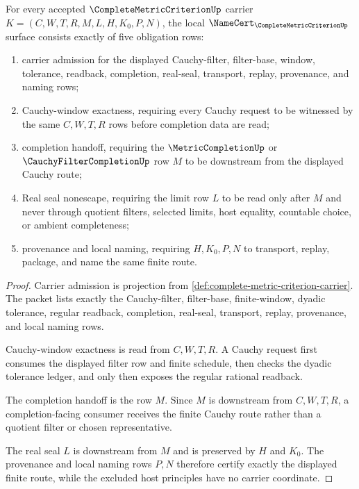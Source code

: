 \begin{theorem}
\label{thm:complete-metric-criterion-namecert-obligations}
For every accepted $\CompleteMetricCriterionUp$ carrier
$K=(C,W,T,R,M,L,H,K_0,P,N)$, the local
$\NameCert_{\CompleteMetricCriterionUp}$ surface consists exactly of five
obligation rows:
\begin{enumerate}
\item carrier admission for the displayed Cauchy-filter, filter-base, window,
  tolerance, readback, completion, real-seal, transport, replay, provenance,
  and naming rows;
\item Cauchy-window exactness, requiring every Cauchy request to be witnessed
  by the same $C,W,T,R$ rows before completion data are read;
\item completion handoff, requiring the $\MetricCompletionUp$ or
  $\CauchyFilterCompletionUp$ row $M$ to be downstream from the displayed
  Cauchy route;
\item Real seal nonescape, requiring the limit row $L$ to be read only after
  $M$ and never through quotient filters, selected limits, host equality,
  countable choice, or ambient completeness;
\item provenance and local naming, requiring $H,K_0,P,N$ to transport,
  replay, package, and name the same finite route.
\end{enumerate}
\end{theorem}
\begin{proof}
Carrier admission is projection from
\autoref{def:complete-metric-criterion-carrier}. The packet lists exactly the
Cauchy-filter, filter-base, finite-window, dyadic tolerance, regular readback,
completion, real-seal, transport, replay, provenance, and local naming rows.

Cauchy-window exactness is read from $C,W,T,R$. A Cauchy request first
consumes the displayed filter row and finite schedule, then checks the dyadic
tolerance ledger, and only then exposes the regular rational readback.

The completion handoff is the row $M$. Since $M$ is downstream from
$C,W,T,R$, a completion-facing consumer receives the finite Cauchy route
rather than a quotient filter or chosen representative.

The real seal $L$ is downstream from $M$ and is preserved by $H$ and $K_0$.
The provenance and local naming rows $P,N$ therefore certify exactly the
displayed finite route, while the excluded host principles have no carrier
coordinate.
\end{proof}

